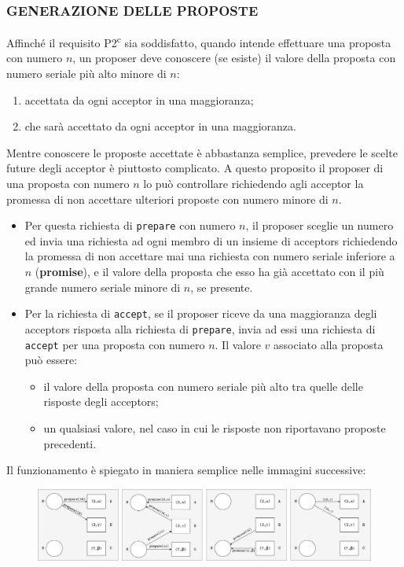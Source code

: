 \subsubsection{GENERAZIONE DELLE PROPOSTE}
Affinché il requisito P2\textsuperscript{c} sia soddisfatto, quando intende effettuare una proposta con numero $n$, un proposer deve conoscere (se esiste) il valore della proposta con numero seriale più alto minore di $n$:
\begin{enumerate}
    \item accettata da ogni acceptor in una maggioranza;
    \item che sarà accettato da ogni acceptor in una maggioranza.
\end{enumerate}
Mentre conoscere le proposte accettate è abbastanza semplice, prevedere le scelte future degli acceptor è piuttosto complicato. A questo proposito il proposer di una proposta con numero $n$ lo può controllare richiedendo agli acceptor la promessa di non accettare ulteriori proposte con numero minore di $n$.

\vspace{5mm}

\begin{itemize}
    \item Per questa richiesta di \texttt{prepare} con numero $n$, il proposer sceglie un numero ed invia una richiesta ad ogni membro di un insieme di acceptors richiedendo la promessa di non accettare mai una richiesta con numero seriale inferiore a $n$ (\textbf{promise}), e il valore della proposta che esso ha già accettato con il più grande numero seriale minore di $n$, se presente.
    \item Per la richiesta di \texttt{accept}, se il proposer riceve da una maggioranza degli acceptors risposta alla richiesta di \texttt{prepare}, invia ad essi una richiesta di \texttt{accept} per una proposta con numero $n$. Il valore $v$ associato alla proposta può essere:
    \begin{itemize}
        \item il valore della proposta con numero seriale più alto tra quelle delle risposte degli acceptors;
        \item un qualsiasi valore, nel caso in cui le risposte non riportavano proposte precedenti.
    \end{itemize}
\end{itemize}
Il funzionamento è spiegato in maniera semplice nelle immagini successive:

\begin{figure}[ht]
    \centering
    \includegraphics[width=14cm]{./Images/cap2/2.13.png}
\end{figure}


